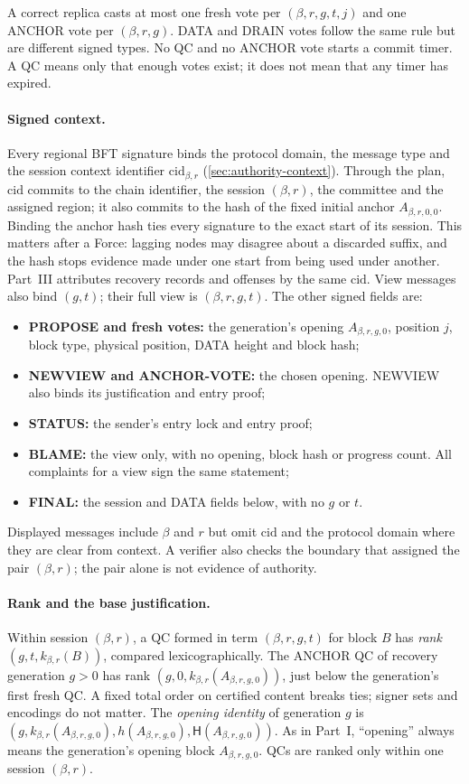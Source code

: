 \documentclass[11pt,a4paper]{article}
\newcommand{\Hash}{\mathsf H}
\newcommand{\defterm}[1]{\textcolor{rrBlue}{\textit{#1}}}
\newcounter{protocol}
\begin{document}
A correct replica casts at most one fresh vote per $(\beta,r,g,t,j)$ and
one ANCHOR vote per $(\beta,r,g)$. DATA and DRAIN votes follow the same
rule but are different signed types. No QC and no ANCHOR vote starts a
commit timer. A QC means only that enough votes exist; it does not mean
that any timer has expired.

\paragraph{Signed context.}
Every regional BFT signature binds the protocol domain, the message type
and the session context identifier $\mathrm{cid}_{\beta,r}$
(\cref{sec:authority-context}). Through the plan, $\mathrm{cid}$ commits
to the chain identifier, the session $(\beta,r)$, the committee and the
assigned region; it also commits to the hash of the fixed initial anchor
$A_{\beta,r,0,0}$. Binding the anchor hash ties every signature to the
exact start of its session. This matters after a Force: lagging nodes may
disagree about a discarded suffix, and the hash stops evidence made under
one start from being used under another. Part~III attributes recovery
records and offenses by the same $\mathrm{cid}$. View messages also bind
$(g,t)$; their full view is $(\beta,r,g,t)$. The other signed fields are:
\begin{itemize}
\item \textbf{PROPOSE and fresh votes:} the generation's opening
$A_{\beta,r,g,0}$, position $j$, block type, physical position, DATA
height and block hash;
\item \textbf{NEWVIEW and ANCHOR-VOTE:} the chosen opening. NEWVIEW
also binds its justification and entry proof;
\item \textbf{STATUS:} the sender's entry lock and entry proof;
\item \textbf{BLAME:} the view only, with no opening, block hash or
progress count. All complaints for a view sign the same statement;
\item \textbf{FINAL:} the session and DATA fields below, with no $g$ or $t$.
\end{itemize}
Displayed messages include $\beta$ and $r$ but omit $\mathrm{cid}$ and the
protocol domain where they are clear from context. A verifier also checks
the boundary that assigned the pair $(\beta,r)$; the pair alone is not
evidence of authority.

\paragraph{Rank and the base justification.}
Within session $(\beta,r)$, a QC formed in term $(\beta,r,g,t)$ for block
$B$ has \defterm{rank} $(g,t,k_{\beta,r}(B))$, compared lexicographically.
The ANCHOR QC of recovery generation $g>0$ has rank $(g,0,k_{\beta,r}(A_{\beta,r,g,0}))$,
just below the generation's first fresh QC. A fixed total order on
certified content breaks ties; signer sets and encodings do not matter.
The \defterm{opening identity} of generation $g$ is
$(g,k_{\beta,r}(A_{\beta,r,g,0}),h(A_{\beta,r,g,0}),\Hash(A_{\beta,r,g,0}))$.
As in Part~I, ``opening'' always means the generation's opening block
$A_{\beta,r,g,0}$. QCs are ranked only within one session $(\beta,r)$.
\end{document}
